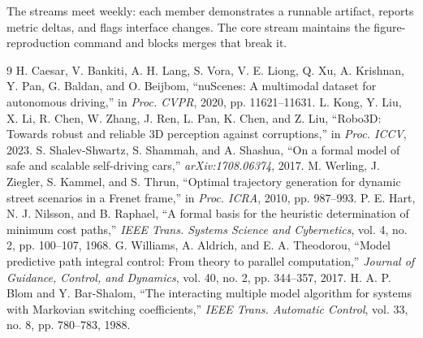 \documentclass[10pt,a4paper]{article}
\begin{document}
The streams meet weekly: each member demonstrates a runnable artifact, reports metric deltas, and flags interface changes. The core stream maintains the figure-reproduction command and blocks merges that break it.

\begingroup
\setlength{\itemsep}{1pt}
\setlength{\parskip}{0pt}
\begin{thebibliography}{9}
 H. Caesar, V. Bankiti, A. H. Lang, S. Vora, V. E. Liong, Q. Xu, A. Krishnan, Y. Pan, G. Baldan, and O. Beijbom, ``nuScenes: A multimodal dataset for autonomous driving,'' in \emph{Proc. CVPR}, 2020, pp. 11621--11631.
 L. Kong, Y. Liu, X. Li, R. Chen, W. Zhang, J. Ren, L. Pan, K. Chen, and Z. Liu, ``Robo3D: Towards robust and reliable 3D perception against corruptions,'' in \emph{Proc. ICCV}, 2023.
 S. Shalev-Shwartz, S. Shammah, and A. Shashua, ``On a formal model of safe and scalable self-driving cars,'' \emph{arXiv:1708.06374}, 2017.
 M. Werling, J. Ziegler, S. Kammel, and S. Thrun, ``Optimal trajectory generation for dynamic street scenarios in a Frenet frame,'' in \emph{Proc. ICRA}, 2010, pp. 987--993.
 P. E. Hart, N. J. Nilsson, and B. Raphael, ``A formal basis for the heuristic determination of minimum cost paths,'' \emph{IEEE Trans. Systems Science and Cybernetics}, vol. 4, no. 2, pp. 100--107, 1968.
 G. Williams, A. Aldrich, and E. A. Theodorou, ``Model predictive path integral control: From theory to parallel computation,'' \emph{Journal of Guidance, Control, and Dynamics}, vol. 40, no. 2, pp. 344--357, 2017.
 H. A. P. Blom and Y. Bar-Shalom, ``The interacting multiple model algorithm for systems with Markovian switching coefficients,'' \emph{IEEE Trans. Automatic Control}, vol. 33, no. 8, pp. 780--783, 1988.
\end{thebibliography}
\endgroup
\end{document}
